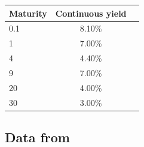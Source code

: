 \medskip
\begin{center}
\begin{tabular}{|l|c|r|}
  \hline
  Maturity & Continuous yield \\
  \hline
  0.1 & 8.10\% \\
  1 & 7.00\%  \\
  4 & 4.40\%  \\
  9 & 7.00\%  \\
  20 & 4.00\%  \\
  30 & 3.00\%  \\
  \hline
\end{tabular}
\end{center}


\subsection{Data from \cite{ametrano2013everything}}

